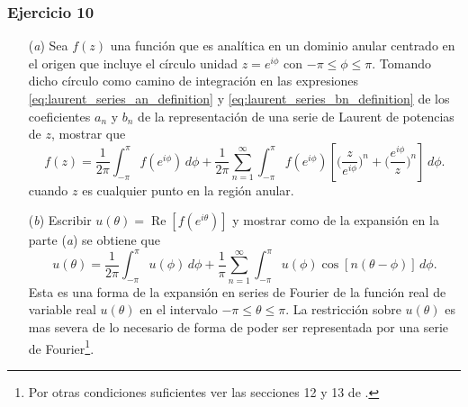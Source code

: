 \documentclass[a4paper]{report}
\renewcommand{\Re}{\operatorname{Re}}
\begin{document}
\subsubsection*{Ejercicio 10}
\begin{enumerate}
 \item[(\textit{a})] Sea \(f(z)\) una función que es analítica en un dominio anular centrado en el origen que incluye el círculo unidad \(z=e^{i\phi}\) con \(-\pi\leq\phi\leq\pi\). Tomando dicho círculo como camino de integración en las expresiones \ref{eq:laurent_series_an_definition} y \ref{eq:laurent_series_bn_definition} de los coeficientes \(a_n\) y \(b_n\) de la representación de una serie de Laurent de potencias de \(z\), mostrar que 
 \[
  f(z)=\frac{1}{2\pi}\int_{-\pi}^\pi f(e^{i\phi})\,d\phi+\frac{1}{2\pi}\sum_{n=1}^\infty\int_{-\pi}^\pi f(e^{i\phi})\left[\bigg(\frac{z}{e^{i\phi}}\bigg)^n+\bigg(\frac{e^{i\phi}}{z}\bigg)^n\right]\,d\phi.
 \]
 cuando \(z\) es cualquier punto en la región anular.
 \item[(\textit{b})] Escribir \(u(\theta)=\Re[f(e^{i\theta})]\) y mostrar como  de la expansión en la parte (\textit{a}) se obtiene que 
 \[
  u(\theta)=\frac{1}{2\pi}\int_{-\pi}^\pi u(\phi)\,d\phi+\frac{1}{\pi}\sum_{n=1}^\infty\int_{-\pi}^\pi u(\phi)\cos[n(\theta-\phi)]\,d\phi.
 \]
 Esta es una forma de la expansión en series de Fourier de la función real de variable real \(u(\theta)\) en el intervalo \(-\pi\leq\theta\leq\pi\). La restricción sobre \(u(\theta)\) es mas severa de lo necesario de forma de poder ser representada por una serie de Fourier\footnote{Por otras condiciones suficientes ver las secciones 12 y 13 de \cite{brown2012fourier}.}.
\end{enumerate}
\end{document}
